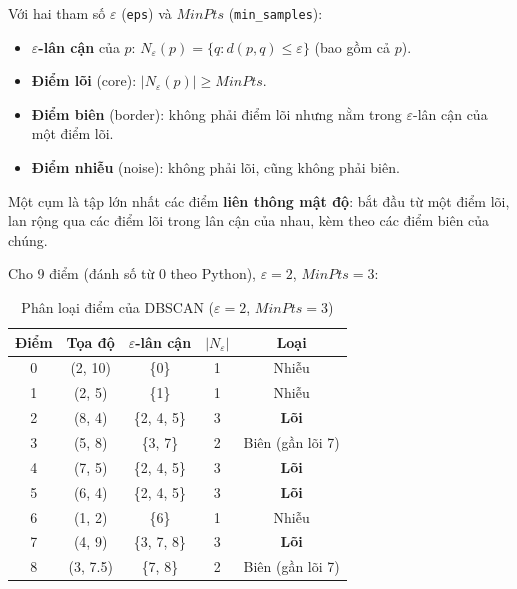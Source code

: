 \begin{definition}
Với hai tham số $\varepsilon$ (\texttt{eps}) và $\mathit{MinPts}$ (\texttt{min\_samples}):
\begin{itemize}
    \item \textbf{$\varepsilon$-lân cận} của $p$: $N_\varepsilon(p) = \{q : d(p, q) \leq \varepsilon\}$ (bao gồm cả $p$).
    \item \textbf{Điểm lõi} (core): $|N_\varepsilon(p)| \geq \mathit{MinPts}$.
    \item \textbf{Điểm biên} (border): không phải điểm lõi nhưng nằm trong $\varepsilon$-lân cận của một điểm lõi.
    \item \textbf{Điểm nhiễu} (noise): không phải lõi, cũng không phải biên.
\end{itemize}
Một cụm là tập lớn nhất các điểm \textbf{liên thông mật độ}: bắt đầu từ một điểm lõi, lan rộng qua các điểm lõi trong lân cận của nhau, kèm theo các điểm biên của chúng.
\end{definition}

\begin{example}
Cho 9 điểm (đánh số từ 0 theo Python), $\varepsilon = 2$, $\mathit{MinPts} = 3$:
\end{example}

\begin{table}[H]
\centering
\begin{tabular}{|c|c|c|c|c|}
\hline
\textbf{Điểm} & \textbf{Tọa độ} & \textbf{$\varepsilon$-lân cận} & \textbf{$|N_\varepsilon|$} & \textbf{Loại} \\
\hline
0 & (2, 10) & \{0\} & 1 & Nhiễu \\ \hline
1 & (2, 5) & \{1\} & 1 & Nhiễu \\ \hline
2 & (8, 4) & \{2, 4, 5\} & 3 & \textbf{Lõi} \\ \hline
3 & (5, 8) & \{3, 7\} & 2 & Biên (gần lõi 7) \\ \hline
4 & (7, 5) & \{2, 4, 5\} & 3 & \textbf{Lõi} \\ \hline
5 & (6, 4) & \{2, 4, 5\} & 3 & \textbf{Lõi} \\ \hline
6 & (1, 2) & \{6\} & 1 & Nhiễu \\ \hline
7 & (4, 9) & \{3, 7, 8\} & 3 & \textbf{Lõi} \\ \hline
8 & (3, 7.5) & \{7, 8\} & 2 & Biên (gần lõi 7) \\ \hline
\end{tabular}
\caption{Phân loại điểm của DBSCAN ($\varepsilon = 2$, $\mathit{MinPts} = 3$)}
\label{tab:dbscan}
\end{table}

